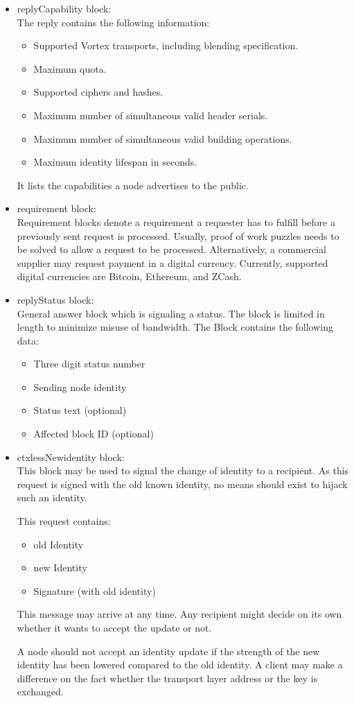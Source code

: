 \begin{itemize}
	\item replyCapability block:\\
	The reply contains the following information:
	\begin{itemize}
		\item Supported Vortex transports, including blending specification.
		\item Maximum quota.
		\item Supported ciphers and hashes.
		\item Maximum number of simultaneous valid header serials.
		\item Maximum number of simultaneous valid building operations.
		\item Maximum identity lifespan in seconds.
	\end{itemize}
	It lists the capabilities a node advertises to the public. 
	
	\item requirement block:\\
	Requirement blocks denote a requirement a requester has to fulfill before a previously sent request is processed. Usually, proof of work puzzles needs to be solved to allow a request to be processed. Alternatively, a commercial supplier may request payment in a digital currency. Currently, supported digital currencies are Bitcoin, Ethereum, and ZCash.
	
	\item replyStatus block:\\
	General answer block which is signaling a status. The block is limited in length to minimize misuse of bandwidth. The Block contains the following data:
	\begin{itemize}
		\item Three digit status number
		\item Sending node identity
		\item Status text (optional)
		\item Affected block ID (optional)
	\end{itemize}
	
	\item ctxlessNewidentity block:\\
	This block may be used to signal the change of identity to a recipient. As this request is signed with the old known identity, no means should exist to hijack such an identity.
	
	This request contains:
	\begin{itemize}
		\item old Identity
		\item new Identity
		\item Signature (with old identity)
	\end{itemize}
	
	This message may arrive at any time. Any recipient might decide on its own whether it wants to accept the update or not.
	
	A node should not accept an identity update if the strength of the new identity has been lowered compared to the old identity. A client may make a difference on the fact whether the transport layer address or the key is exchanged. 
\end{itemize}

